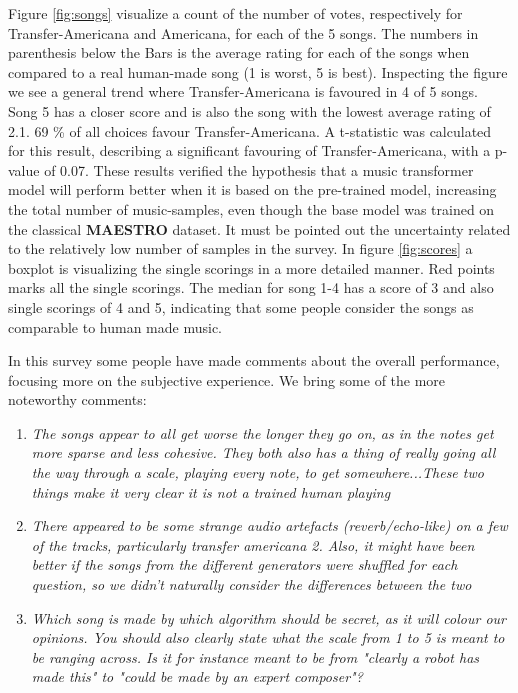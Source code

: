 \documentclass{IEEEtran}
\begin{document}
Figure \ref{fig:songs} visualize a count of the number of votes, respectively
for Transfer-Americana and Americana, for each of the 5 songs. The numbers in
parenthesis below the Bars is the average rating for each of the songs when
compared to a real human-made song (1 is worst, 5 is best). Inspecting the
figure we see a general trend where Transfer-Americana is favoured in 4 of 5
songs. Song 5 has a closer score and is also the song with the lowest average
rating of 2.1. 69 \% of all choices favour Transfer-Americana. A t-statistic
was calculated for this result, describing a significant favouring of
Transfer-Americana, with a p-value of 0.07. These results verified the
hypothesis that a music transformer model will perform better when it is
based on the pre-trained model, increasing the total number of music-samples,
even though the base model was trained on the classical \textbf{MAESTRO}
dataset. It must be pointed out the uncertainty related to the relatively low
number of samples in the survey. In figure \ref{fig:scores} a boxplot is
visualizing the single scorings in a more detailed manner. Red points marks
all the single scorings. The median for song 1-4 has a score of 3 and also
single scorings of 4 and 5, indicating that some people consider the songs as
comparable to human made music.

In this survey some people have made comments about the overall performance,
focusing more on the subjective experience. We bring some of the more
noteworthy comments: \begin{enumerate} \item \emph{The songs appear to all
get worse the longer they go on, as in the notes get more sparse and less
cohesive. They both also has a thing of really going all the way through a
scale, playing every note, to get somewhere...These two things make it very
clear it is not a trained human playing} \item \emph{There appeared to be
some strange audio artefacts (reverb/echo-like) on a few of the tracks,
particularly transfer americana 2. Also, it might have been better if the
songs from the different generators were shuffled for each question, so we
didn't naturally consider the differences between the two} \item \emph{Which
song is made by which algorithm should be secret, as it will colour our
opinions. You should also clearly state what the scale from 1 to 5 is meant
to be ranging across. Is it for instance meant to be from "clearly a robot
has made this" to "could be made by an expert composer"?} \end{enumerate}
\end{document}
